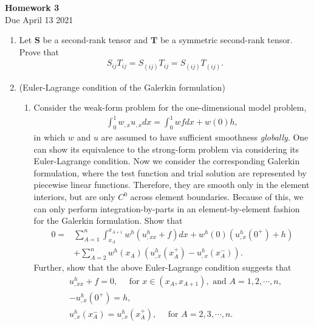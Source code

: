 \documentclass[12pt]{article}
\begin{document}
\begin{center}
\textbf{\Large
Homework 3
}\\
\normalsize Due April 13 2021





\end{center}
\begin{enumerate}
\item Let $\bm S$ be a second-rank tensor and $\bm T$ be a symmetric second-rank tensor. Prove that
\begin{align*}
S_{ij} T_{ij} = S_{(ij)}T_{ij} = S_{(ij)}T_{(ij)}.
\end{align*}

\item (Euler-Lagrange condition of the Galerkin formulation) 
\begin{enumerate}
\item Consider the weak-form problem for the one-dimensional model problem,
\begin{align*}
\int_0^1 w_{,x} u_{,x} dx = \int_0^1 w f dx + w(0)h,
\end{align*}
in which $w$ and $u$ are assumed to have sufficient smoothness \textit{globally}. One can show its equivalence to the strong-form problem via considering its Euler-Lagrange condition. Now we consider the corresponding Galerkin formulation, where the test function and trial solution are represented by piecewise linear functions. Therefore, they are smooth only in the element interiors, but are only $C^0$ across element boundaries. Because of this, we can only perform integration-by-parts in an element-by-element fashion for the Galerkin formulation. Show that
\begin{align*}
0 =& \sum_{A=1}^{n}\int_{x_A}^{x_{A+1}} w^h \left( u^h_{,xx} + f \right)dx + w^h(0)\left( u^h_{,x}(0^+) + h \right) \\
&+ \sum_{A=2}^{n} w^h(x_A)\left( u^h_{,x}(x^{+}_A) - u^h_{,x}(x^{-}_A)\right).
\end{align*}
Further, show that the above Euler-Lagrange condition suggests that
\begin{align*}
& u^h_{,xx} + f = 0, \quad \mbox{ for } x \in (x_A, x_{A+1}), \mbox{ and } A = 1, 2, \cdots, n, \\
& -u^h_{,x}(0^{+}) = h, \\
& u^h_{,x}(x^{-}_A) = u^h_{,x}(x^{+}_A), \quad \mbox{ for } A = 2,3,\cdots, n.
\end{align*}


\end{enumerate}
\end{enumerate}
\end{document}
